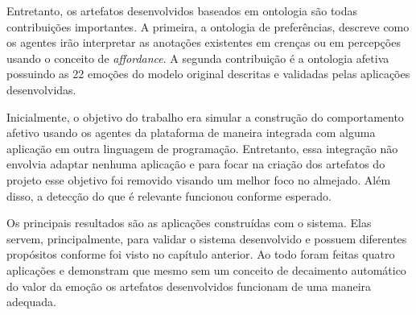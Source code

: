 Entretanto, os artefatos desenvolvidos baseados em ontologia são todas
contribuições importantes. A primeira, a ontologia de preferências, descreve como os
agentes irão interpretar as anotações existentes em crenças ou em percepções
usando o conceito de \emph{affordance}. A segunda contribuição é a ontologia
afetiva possuindo as 22 emoções do modelo original descritas e validadas pelas
aplicações desenvolvidas.

Inicialmente, o objetivo do trabalho era simular a construção do comportamento
afetivo usando os agentes da plataforma \jason de maneira integrada com alguma
aplicação em outra linguagem de programação. Entretanto, essa integração não
envolvia adaptar nenhuma aplicação e para focar na criação dos artefatos do
projeto esse objetivo foi removido visando um melhor foco no almejado. Além
disso, a detecção do que é relevante funcionou conforme esperado.

Os principais resultados são as aplicações construídas com o sistema. Elas
servem, principalmente, para validar o sistema desenvolvido e possuem
diferentes propósitos conforme foi visto no capítulo anterior. Ao todo foram
feitas quatro aplicações e demonstram que mesmo sem um conceito de decaimento
automático do valor da emoção os artefatos desenvolvidos funcionam de uma maneira
adequada.

